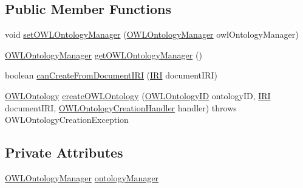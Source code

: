 \subsection*{Public Member Functions}
\begin{DoxyCompactItemize}
\item 
void \hyperlink{classuk_1_1ac_1_1manchester_1_1cs_1_1owl_1_1owlapi_1_1_abstract_in_mem_o_w_l_ontology_factory_a9a0a469a9e7bab990d849de5bd37aae8}{set\-O\-W\-L\-Ontology\-Manager} (\hyperlink{interfaceorg_1_1semanticweb_1_1owlapi_1_1model_1_1_o_w_l_ontology_manager}{O\-W\-L\-Ontology\-Manager} owl\-Ontology\-Manager)
\item 
\hyperlink{interfaceorg_1_1semanticweb_1_1owlapi_1_1model_1_1_o_w_l_ontology_manager}{O\-W\-L\-Ontology\-Manager} \hyperlink{classuk_1_1ac_1_1manchester_1_1cs_1_1owl_1_1owlapi_1_1_abstract_in_mem_o_w_l_ontology_factory_a5232b9627ddcc6ad7f09acd6ddce7ecc}{get\-O\-W\-L\-Ontology\-Manager} ()
\item 
boolean \hyperlink{classuk_1_1ac_1_1manchester_1_1cs_1_1owl_1_1owlapi_1_1_abstract_in_mem_o_w_l_ontology_factory_a97abb6ae8bd19245d66976cd7c78c630}{can\-Create\-From\-Document\-I\-R\-I} (\hyperlink{classorg_1_1semanticweb_1_1owlapi_1_1model_1_1_i_r_i}{I\-R\-I} document\-I\-R\-I)
\item 
\hyperlink{interfaceorg_1_1semanticweb_1_1owlapi_1_1model_1_1_o_w_l_ontology}{O\-W\-L\-Ontology} \hyperlink{classuk_1_1ac_1_1manchester_1_1cs_1_1owl_1_1owlapi_1_1_abstract_in_mem_o_w_l_ontology_factory_ace458287d293c7d1cc44775ac87966c5}{create\-O\-W\-L\-Ontology} (\hyperlink{classorg_1_1semanticweb_1_1owlapi_1_1model_1_1_o_w_l_ontology_i_d}{O\-W\-L\-Ontology\-I\-D} ontology\-I\-D, \hyperlink{classorg_1_1semanticweb_1_1owlapi_1_1model_1_1_i_r_i}{I\-R\-I} document\-I\-R\-I, \hyperlink{interfaceorg_1_1semanticweb_1_1owlapi_1_1model_1_1_o_w_l_ontology_factory_1_1_o_w_l_ontology_creation_handler}{O\-W\-L\-Ontology\-Creation\-Handler} handler)  throws O\-W\-L\-Ontology\-Creation\-Exception 
\end{DoxyCompactItemize}
\subsection*{Private Attributes}
\begin{DoxyCompactItemize}
\item 
\hyperlink{interfaceorg_1_1semanticweb_1_1owlapi_1_1model_1_1_o_w_l_ontology_manager}{O\-W\-L\-Ontology\-Manager} \hyperlink{classuk_1_1ac_1_1manchester_1_1cs_1_1owl_1_1owlapi_1_1_abstract_in_mem_o_w_l_ontology_factory_a975223cfd3a3acaf399ffcf36b8750c4}{ontology\-Manager}
\end{DoxyCompactItemize}
